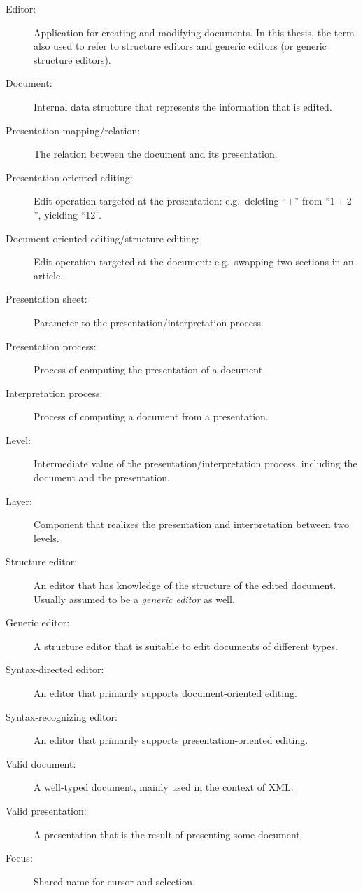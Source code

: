 \begin{description}
\item[Editor:] Application for creating and modifying documents. In this thesis, the term also used to refer to structure editors and generic editors (or generic structure editors).
\item[Document:] Internal data structure that represents the information that is edited.
\item[Presentation mapping/relation:] The relation between the document and its presentation.
\item[Presentation-oriented editing:] Edit operation targeted at the presentation: e.g.\ deleting ``\;$+$\;'' from ``$1+2$'', yielding ``$12$''.
\item[Document-oriented editing/structure editing:] Edit operation targeted at the document: e.g.\ swapping two sections in an article.
\item[Presentation sheet:] Parameter to the presentation/interpretation process. 
\item[Presentation process:] Process of computing the presentation of a document.
\item[Interpretation process:] Process of computing a document from a presentation.
\item[Level:] Intermediate value of the presentation/interpretation process, including the document and the presentation.
\item[Layer:] Component that realizes the presentation and interpretation between two levels.
\item[Structure editor:] An editor that has knowledge of the structure of the edited document. Usually assumed to be a {\em generic editor} as well.
\item[Generic editor:] A structure editor that is suitable to edit documents of different types.
\item[Syntax-directed editor:] An editor that primarily supports document-oriented editing.
\item[Syntax-recognizing editor:] An editor that primarily supports presentation-oriented editing.
\item[Valid document:] A well-typed document, mainly used in the context of XML.
\item[Valid presentation:] A presentation that is the result of presenting some document.
\item[Focus:] Shared name for cursor and selection.
\end{description} 

